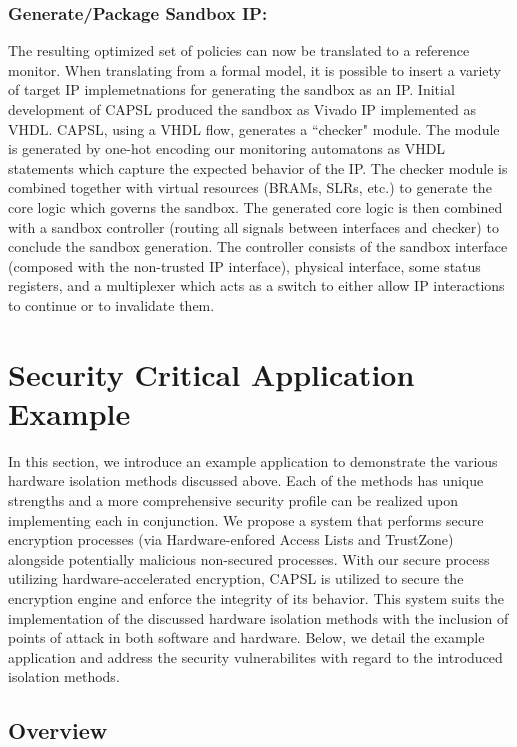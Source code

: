\documentclass[sigconf]{acmart}
\theoremstyle{plain}
\theoremstyle{remark}
\begin{document}
\subsubsection{Generate/Package Sandbox IP:}
The resulting optimized set of policies can now be translated to a reference monitor. When translating from a formal model, it is possible to insert a variety of target IP implemetnations for generating the sandbox as an IP. Initial development of CAPSL produced the sandbox as Vivado IP implemented as VHDL. CAPSL, using a VHDL flow, generates a ``checker" module. The module is generated by one-hot encoding our monitoring automatons as VHDL statements which capture the expected behavior of the IP. The checker module is combined together with virtual resources (BRAMs, SLRs, etc.) to generate the core logic which governs the sandbox. The generated core logic is then combined with a sandbox controller (routing all signals between interfaces and checker) to conclude the sandbox generation. The controller consists of the sandbox interface (composed with the non-trusted IP interface), physical interface, some status registers, and a multiplexer which acts as a switch to either allow IP interactions to continue or to invalidate them.



\section{Security Critical Application Example} \label{sec:application}

In this section, we introduce an example application to demonstrate the various hardware isolation methods discussed above. Each of the methods has unique strengths and a more comprehensive security profile can be realized upon implementing each in conjunction. We propose a system that performs secure encryption processes (via Hardware-enfored Access Lists and TrustZone) alongside potentially malicious non-secured processes. With our secure process utilizing hardware-accelerated encryption, CAPSL is utilized to secure the encryption engine and enforce the integrity of its behavior. This system suits the implementation of the discussed hardware isolation methods with the inclusion of points of attack in both software and hardware. Below, we detail the example application and address the security vulnerabilites with regard to the introduced isolation methods.


\subsection{Overview}
\end{document}
